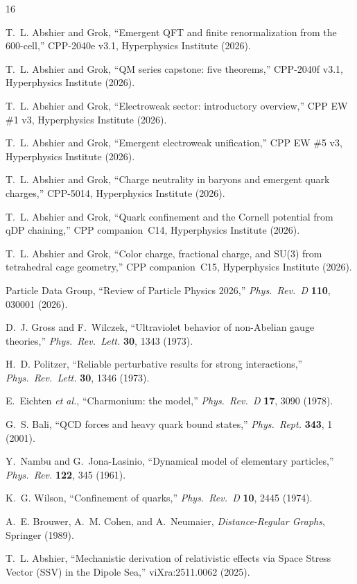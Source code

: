 \documentclass[11pt,a4paper]{article}
\begin{document}

\begin{thebibliography}{16}

T.~L. Abshier and Grok,
``Emergent QFT and finite renormalization from the 600-cell,''
CPP-2040e v3.1, Hyperphysics Institute (2026).

T.~L. Abshier and Grok,
``QM series capstone: five theorems,''
CPP-2040f v3.1, Hyperphysics Institute (2026).

T.~L. Abshier and Grok,
``Electroweak sector: introductory overview,''
CPP EW \#1 v3, Hyperphysics Institute (2026).

T.~L. Abshier and Grok,
``Emergent electroweak unification,''
CPP EW \#5 v3, Hyperphysics Institute (2026).

T.~L. Abshier and Grok,
``Charge neutrality in baryons and emergent quark charges,''
CPP-5014, Hyperphysics Institute (2026).

T.~L. Abshier and Grok,
``Quark confinement and the Cornell potential from qDP chaining,''
CPP companion~C14, Hyperphysics Institute (2026).

T.~L. Abshier and Grok,
``Color charge, fractional charge, and SU(3) from tetrahedral
cage geometry,''
CPP companion~C15, Hyperphysics Institute (2026).

Particle Data Group,
``Review of Particle Physics 2026,''
\textit{Phys.\ Rev.\ D} \textbf{110}, 030001 (2026).

D.~J. Gross and F.~Wilczek,
``Ultraviolet behavior of non-Abelian gauge theories,''
\textit{Phys.\ Rev.\ Lett.} \textbf{30}, 1343 (1973).

H.~D. Politzer,
``Reliable perturbative results for strong interactions,''
\textit{Phys.\ Rev.\ Lett.} \textbf{30}, 1346 (1973).

E.~Eichten \textit{et al.},
``Charmonium: the model,''
\textit{Phys.\ Rev.\ D} \textbf{17}, 3090 (1978).

G.~S. Bali,
``QCD forces and heavy quark bound states,''
\textit{Phys.\ Rept.} \textbf{343}, 1 (2001).

Y.~Nambu and G.~Jona-Lasinio,
``Dynamical model of elementary particles,''
\textit{Phys.\ Rev.} \textbf{122}, 345 (1961).

K.~G. Wilson,
``Confinement of quarks,''
\textit{Phys.\ Rev.\ D} \textbf{10}, 2445 (1974).

A.~E. Brouwer, A.~M. Cohen, and A.~Neumaier,
\textit{Distance-Regular Graphs}, Springer (1989).

T.~L. Abshier,
``Mechanistic derivation of relativistic effects via Space Stress
Vector (SSV) in the Dipole Sea,''
viXra:2511.0062 (2025).

\end{thebibliography}
\end{document}
